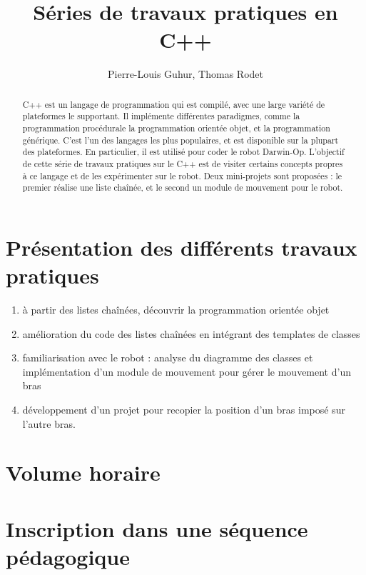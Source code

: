 \documentclass[abstracton]{scrartcl}
\title{Séries de travaux pratiques en C++}
\author{Pierre-Louis Guhur,      Thomas Rodet}
\begin{document}
\maketitle

\begin{abstract}
C++ est un langage de programmation qui est compilé, avec une large variété de plateformes le supportant.
Il implémente différentes paradigmes, comme la programmation procédurale  la programmation orientée objet, et la programmation générique.
C'est l'un des langages les plus populaires, et est disponible sur la plupart des plateformes.
En particulier, il est utilisé pour coder le robot Darwin-Op.
L'objectif de cette série de travaux pratiques sur le C++ est de visiter certains concepts propres à ce langage et de les expérimenter sur le robot.
Deux mini-projets sont proposées : le premier réalise une liste chaînée, et le second un module de mouvement pour le robot.
\end{abstract}


\section{Présentation des différents travaux pratiques}
\label{sec:presentation}

\begin{enumerate}
    \item à partir des listes chaînées, découvrir la programmation orientée objet
    \item amélioration du code des listes chaînées en intégrant des templates de classes
    \item familiarisation avec le robot : analyse du diagramme des classes et implémentation d'un module de mouvement pour gérer le mouvement d'un bras
    \item développement d'un projet pour recopier la position d'un bras imposé sur l'autre bras.
\end{enumerate}


\section{Volume horaire}
\label{sec:heures}

\section{Inscription dans une séquence pédagogique}
\label{sec:sequence}
\end{document}
